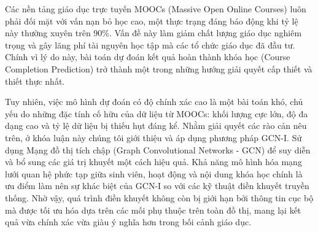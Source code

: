 
Các nền tảng giáo dục trực tuyến MOOCs (Massive Open Online Courses) luôn phải đối mặt với vấn nạn bỏ học cao, một thực trạng đáng báo động khi tỷ lệ này thường xuyên trên 90\%. Vấn đề này làm giảm chất lượng giáo dục nghiêm trọng và gây lãng phí tài nguyên học tập mà các tổ chức giáo dục đã đầu tư. Chính vì lý do này, bài toán dự đoán kết quả hoàn thành khóa học (Course Completion Prediction) trở thành một trong những hướng giải quyết cấp thiết và thiết thực nhất.

Tuy nhiên, việc mô hình dự đoán có độ chính xác cao là một bài toán khó, chủ yếu do những đặc tính cố hữu của dữ liệu từ MOOCs: khối lượng cực lớn, độ đa dạng cao và tỷ lệ dữ liệu bị thiếu hụt đáng kể. Nhằm giải quyết các rào cản nêu trên, ở khóa luận này chúng tôi giới thiệu và áp dụng phương pháp GCN-I. Sử dụng Mạng đồ thị tích chập (Graph Convolutional Networks - GCN) để suy diễn và bổ sung các giá trị khuyết một cách hiệu quả. Khả năng mô hình hóa mạng lưới quan hệ phức tạp giữa sinh viên, hoạt động và nội dung khóa học chính là ưu điểm làm nên sự khác biệt của GCN-I so với các kỹ thuật điền khuyết truyền thống. Nhờ vậy, quá trình điền khuyết không còn bị giới hạn bởi thông tin cục bộ mà được tối ưu hóa dựa trên các mối phụ thuộc trên toàn đồ thị, mang lại kết quả vừa chính xác vừa giàu ý nghĩa hơn trong bối cảnh giáo dục.

